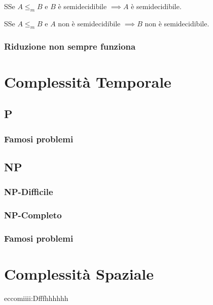 \documentclass{article}  %
\theoremstyle{definition}
\begin{document}
\begin{theorem}{3.3}
  SSe $A \leq_m B$ e $B$ è semidecidibile $\implies A$ è semidecidibile. 
\end{theorem}
\begin{theorem}{3.4}
  SSe $A \leq_m B$ e $A$ non è semidecidibile $\implies B$ non è semidecidibile. 
\end{theorem}
\subsubsection{Riduzione non sempre funziona}

\section{Complessità Temporale}
\subsection{P}
\subsubsection{Famosi problemi}
\subsection{NP}
\subsubsection{NP-Difficile}
\subsubsection{NP-Completo}
\subsubsection{Famosi problemi}
\section{Complessità Spaziale}
eccomiiii:Dfffhhhhhh
\end{document}
